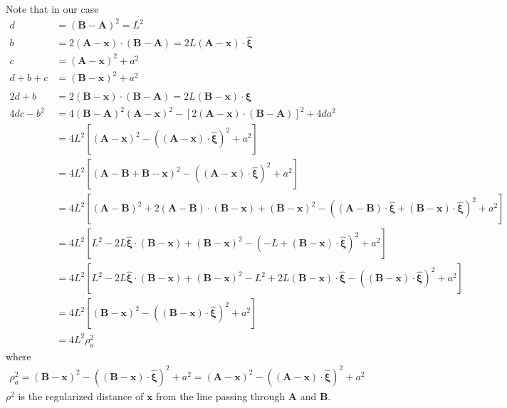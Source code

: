 \documentclass[10pt]{report}
\begin{document}
{Note that in our case
\begin{align}
d&=(\bm B-\bm A)^2=L^2\\
b&=2(\bm A-\bm x)\cdot(\bm B-\bm A)=2L(\bm A-\bm x)\cdot\hat{\bm\xi}\\
c&=(\bm A-\bm x)^2+a^2\\
d+b+c&=(\bm B-\bm x)^2+a^2\\
2d+b&=2(\bm B-\bm x)\cdot(\bm B-\bm A)=2L(\bm B-\bm x)\cdot{\hat{\bm \xi}}\\
4dc-b^2&=4(\bm B-\bm A)^2(\bm A-\bm x)^2-[2(\bm A-\bm x)\cdot(\bm B-\bm A)]^2+4da^2\nonumber\\
&=4L^2[(\bm A-\bm x)^2-((\bm A-\bm x)\cdot\hat{\bm\xi})^2+a^2]\nonumber\\
&=4L^2[(\bm A-\bm B+\bm B-\bm x)^2-((\bm A-\bm x)\cdot\hat{\bm\xi})^2+a^2]\nonumber\\
&=4L^2[(\bm A-\bm B)^2+2(\bm A-\bm B)\cdot(\bm B-\bm x)+(\bm B-\bm x)^2-((\bm A-\bm B)\cdot\hat{\bm\xi}+(\bm B-\bm x)\cdot\hat{\bm\xi})^2+a^2]\nonumber\\
&=4L^2[L^2-2L\hat{\bm\xi}\cdot(\bm B-\bm x)+(\bm B-\bm x)^2-(-L+(\bm B-\bm x)\cdot\hat{\bm\xi})^2+a^2]\nonumber\\
&=4L^2[L^2-2L\hat{\bm\xi}\cdot(\bm B-\bm x)+(\bm B-\bm x)^2-L^2+2L(\bm B-\bm x)\cdot\hat{\bm\xi}-((\bm B-\bm x)\cdot\hat{\bm\xi})^2+a^2]\nonumber\\
&=4L^2[(\bm B-\bm x)^2-((\bm B-\bm x)\cdot\hat{\bm\xi})^2+a^2]\nonumber\\
&=4L^2\rho^2_a
\end{align}
where 
\begin{align}
\rho^2_a=(\bm B-\bm x)^2-((\bm B-\bm x)\cdot\hat{\bm\xi})^2+a^2=(\bm A-\bm x)^2-((\bm A-\bm x)\cdot\hat{\bm\xi})^2+a^2
\end{align}
$\rho^2$ is the regularized distance of $\bm x$ from the line passing through $\bm A$ and $\bm B$.



}
\end{document}
